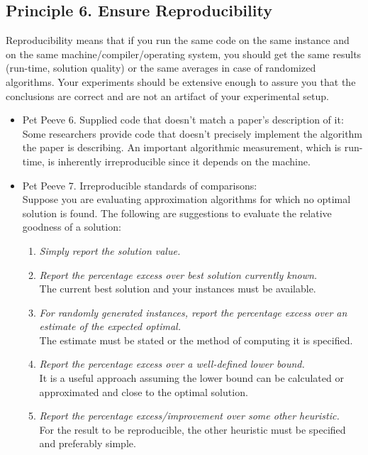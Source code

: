 \documentclass[]{scrartcl}
\begin{document}
\subsection*{Principle 6. Ensure Reproducibility}
Reproducibility means that if you run the same code on the same instance and on the same machine/compiler/operating system, you should get the same results (run-time, solution quality) or the same averages in case of randomized algorithms. Your experiments should be extensive enough to assure you that the conclusions are correct and are not an artifact of your experimental setup.
\begin{itemize}
	\item Pet Peeve 6. Supplied code that doesn't match a paper's description of it: \\
	Some researchers provide code that doesn't precisely implement the algorithm the paper is describing. 
	An important algorithmic measurement, which is run-time, is inherently irreproducible since it depends on the machine. 
	\item Pet Peeve 7. Irreproducible standards of comparisons: \\
	Suppose you are evaluating approximation algorithms for which no optimal solution is found. The following are suggestions to evaluate the relative goodness of a solution:
	\begin{enumerate}
		\item \textit{Simply report the solution value.}
		\item \textit{Report the percentage excess over best solution currently known.} \\
		The current best solution and your instances must be available.
		\item \textit{For randomly generated instances, report the percentage excess over an estimate of the expected optimal.} \\
		The estimate must be stated or the method of computing it is specified.
		\item \textit{Report the percentage excess over a well-defined lower bound.} \\
		It is a useful approach assuming the lower bound can be calculated or approximated and close to the optimal solution.
		\item \textit{Report the percentage excess/improvement over some other heuristic.} \\
		For the result to be reproducible, the other heuristic must be specified and preferably simple.
	\end{enumerate}

\end{itemize}
\end{document}
